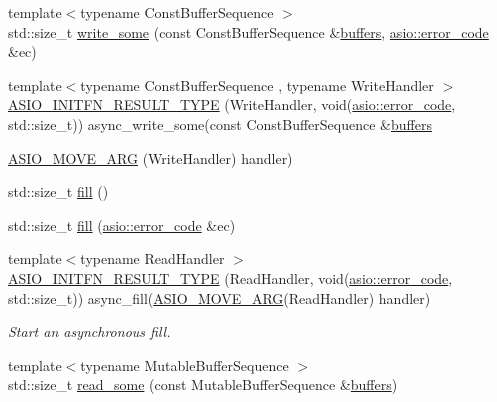 \begin{DoxyCompactItemize}
\item 
{\footnotesize template$<$typename Const\+Buffer\+Sequence $>$ }\\std\+::size\+\_\+t \hyperlink{classasio_1_1buffered__stream_afb094ba3b59bcb93ed0de25a11e53c98}{write\+\_\+some} (const Const\+Buffer\+Sequence \&\hyperlink{group__async__read_ga54dede45c3175148a77fe6635222c47d}{buffers}, \hyperlink{classasio_1_1error__code}{asio\+::error\+\_\+code} \&ec)
\item 
{\footnotesize template$<$typename Const\+Buffer\+Sequence , typename Write\+Handler $>$ }\\\hyperlink{classasio_1_1buffered__stream_a557349498deecd3e1aafb09f7935100c}{A\+S\+I\+O\+\_\+\+I\+N\+I\+T\+F\+N\+\_\+\+R\+E\+S\+U\+L\+T\+\_\+\+T\+Y\+P\+E} (Write\+Handler, void(\hyperlink{classasio_1_1error__code}{asio\+::error\+\_\+code}, std\+::size\+\_\+t)) async\+\_\+write\+\_\+some(const Const\+Buffer\+Sequence \&\hyperlink{group__async__read_ga54dede45c3175148a77fe6635222c47d}{buffers}
\item 
\hyperlink{classasio_1_1buffered__stream_a5bcc9cc7a14cb42d13454faee7828a4c}{A\+S\+I\+O\+\_\+\+M\+O\+V\+E\+\_\+\+A\+R\+G} (Write\+Handler) handler)
\item 
std\+::size\+\_\+t \hyperlink{classasio_1_1buffered__stream_a10eb359709c514c845fdf7b20c153e2c}{fill} ()
\item 
std\+::size\+\_\+t \hyperlink{classasio_1_1buffered__stream_a26778eb43d9c6a0eba7a4219187b923a}{fill} (\hyperlink{classasio_1_1error__code}{asio\+::error\+\_\+code} \&ec)
\item 
{\footnotesize template$<$typename Read\+Handler $>$ }\\\hyperlink{classasio_1_1buffered__stream_a06fb259d957d62b5960dc7fd4b2198a0}{A\+S\+I\+O\+\_\+\+I\+N\+I\+T\+F\+N\+\_\+\+R\+E\+S\+U\+L\+T\+\_\+\+T\+Y\+P\+E} (Read\+Handler, void(\hyperlink{classasio_1_1error__code}{asio\+::error\+\_\+code}, std\+::size\+\_\+t)) async\+\_\+fill(\hyperlink{classasio_1_1buffered__stream_a5bcc9cc7a14cb42d13454faee7828a4c}{A\+S\+I\+O\+\_\+\+M\+O\+V\+E\+\_\+\+A\+R\+G}(Read\+Handler) handler)
\begin{DoxyCompactList}\small\item\em Start an asynchronous fill. \end{DoxyCompactList}\item 
{\footnotesize template$<$typename Mutable\+Buffer\+Sequence $>$ }\\std\+::size\+\_\+t \hyperlink{classasio_1_1buffered__stream_a539ef9d94a42e0c30f47112ecee65b45}{read\+\_\+some} (const Mutable\+Buffer\+Sequence \&\hyperlink{group__async__read_ga54dede45c3175148a77fe6635222c47d}{buffers})

\end{DoxyCompactItemize}
